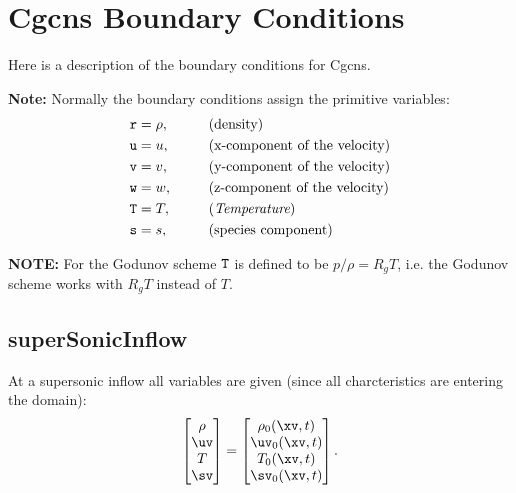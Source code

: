 \section{Cgcns Boundary Conditions} \label{sec:cgcnsBC}

Here is a description of the boundary conditions for Cgcns.

{\bf Note:} Normally the boundary conditions assign the primitive variables:
\begin{alignat}{3}
  {\tt r} &= \rho , \qquad&&\text{(density)} \\
  {\tt u} &= u,    &&\text{(x-component of the velocity)} \\
  {\tt v} &= v ,   &&\text{(y-component of the velocity)}\\
  {\tt w} &= w ,   &&\text{(z-component of the velocity)}\\
  {\tt T} &= T,    &&\text{({\em Temperature})} \\
  {\tt s} &= s,    &&\text{(species component)}
\end{alignat}

{\bf NOTE:} For the Godunov scheme ${\tt T}$ is defined to be $p/\rho = R_g T$, i.e. the Godunov scheme
works with $R_g T$ instead of $T$.



\subsection{superSonicInflow} \label{sec:bc:superSonicInflow}

At a supersonic inflow all variables are given (since all charcteristics are entering the domain):
\begin{align}
   \begin{bmatrix}
       \rho \\
       \uv  \\
       T    \\
       \sv  
   \end{bmatrix}
  = 
   \begin{bmatrix}
       \rho_0(\xv,t) \\
       \uv_0(\xv,t)  \\
       T_0 (\xv,t)   \\
       \sv_0(\xv,t)  
   \end{bmatrix}.
\end{align}

